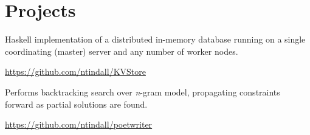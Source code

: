 \documentclass[letterpaper]{deedy-resume} %
\begin{document}
\begin{minipage}[t]{0.66\textwidth}
\sectionspace %







\section{Projects}

\begin{tightitemize}
\item Haskell implementation of a distributed in-memory database running on a
single coordinating (master) server and any number of worker nodes. 
\item \url{https://github.com/ntindall/KVStore}
\end{tightitemize}
\sectionspace %

\begin{tightitemize}
\item Performs backtracking search over \emph{n}-gram model, propagating constraints forward as partial solutions are found.
\item \url{https://github.com/ntindall/poetwriter}
\end{tightitemize}
\sectionspace %


\end{minipage}
\end{document}
